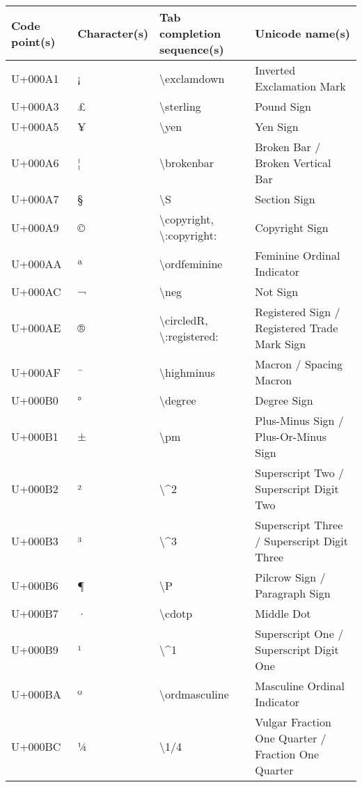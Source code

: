

\begin{table}[h]

\begin{tabulary}{\linewidth}{|L|L|L|L|}
\hline
Code point(s) & Character(s) & Tab completion sequence(s) & Unicode name(s) \\
\hline
U+000A1 & ¡ & {\textbackslash}exclamdown & Inverted Exclamation Mark \\
\hline
U+000A3 & £ & {\textbackslash}sterling & Pound Sign \\
\hline
U+000A5 & ¥ & {\textbackslash}yen & Yen Sign \\
\hline
U+000A6 & ¦ & {\textbackslash}brokenbar & Broken Bar / Broken Vertical Bar \\
\hline
U+000A7 & § & {\textbackslash}S & Section Sign \\
\hline
U+000A9 & © & {\textbackslash}copyright, {\textbackslash}:copyright: & Copyright Sign \\
\hline
U+000AA & ª & {\textbackslash}ordfeminine & Feminine Ordinal Indicator \\
\hline
U+000AC & ¬ & {\textbackslash}neg & Not Sign \\
\hline
U+000AE & ® & {\textbackslash}circledR, {\textbackslash}:registered: & Registered Sign / Registered Trade Mark Sign \\
\hline
U+000AF & ¯ & {\textbackslash}highminus & Macron / Spacing Macron \\
\hline
U+000B0 & ° & {\textbackslash}degree & Degree Sign \\
\hline
U+000B1 & ± & {\textbackslash}pm & Plus-Minus Sign / Plus-Or-Minus Sign \\
\hline
U+000B2 & ² & {\textbackslash}{\textasciicircum}2 & Superscript Two / Superscript Digit Two \\
\hline
U+000B3 & ³ & {\textbackslash}{\textasciicircum}3 & Superscript Three / Superscript Digit Three \\
\hline
U+000B6 & ¶ & {\textbackslash}P & Pilcrow Sign / Paragraph Sign \\
\hline
U+000B7 & · & {\textbackslash}cdotp & Middle Dot \\
\hline
U+000B9 & ¹ & {\textbackslash}{\textasciicircum}1 & Superscript One / Superscript Digit One \\
\hline
U+000BA & º & {\textbackslash}ordmasculine & Masculine Ordinal Indicator \\
\hline
U+000BC & ¼ & {\textbackslash}1/4 & Vulgar Fraction One Quarter / Fraction One Quarter \\

\end{tabulary}
\end{table}
